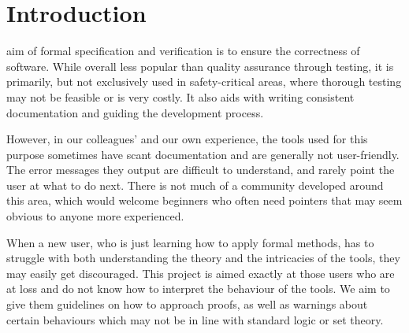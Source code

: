 \documentclass[12pt,journal,duplex]{IEEEtran}
\begin{document}

	\maketitle


	\IEEEdisplaynotcompsoctitleabstractindextext


	\IEEEpeerreviewmaketitle
	\clearpage
	\tableofcontents
	\clearpage
	\twocolumn
	\section{Introduction}
	 aim of formal specification and verification is to ensure the correctness of software. While overall less popular than quality assurance through testing, it is primarily, but not exclusively used in safety-critical areas, where thorough testing may not be feasible or is very costly. It also aids with writing consistent documentation and guiding the development process.

	However, in our colleagues' and our own experience, the tools used for this purpose sometimes have scant documentation and are generally not user-friendly. The error messages they output are difficult to understand, and rarely point the user at what to do next. There is not much of a community developed around this area, which would welcome beginners who often need pointers that may seem obvious to anyone more experienced.

	When a new user, who is just learning how to apply formal methods, has to struggle with both understanding the theory and the intricacies of the tools, they may easily get discouraged. This project is aimed exactly at those users who are at loss and do not know how to interpret the behaviour of the tools. We aim to give them guidelines on how to approach proofs, as well as warnings about certain behaviours which may not be in line with standard logic or set theory.
\end{document}
